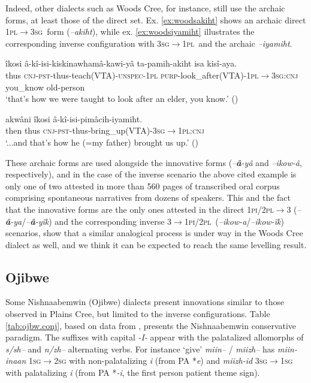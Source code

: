 \documentclass[twoside,a4paper,11pt]{article}
\newcommand{\ipa}[1]{{\phon\textit{#1}}}
\newcommand{\sg}{\textsc{sg}}
\newcommand{\pl}{\textsc{pl}}
\newcommand{\cnj}{\textsc{cnj}}
\newcommand{\pli}{\textsc{pi}}
\newcommand{\pst}{\textsc{pst}}
\newcommand{\purp}{\textsc{purp}}
\newcommand{\unspec}{\textsc{unspec}}
\begin{document}
Indeed, other dialects such as Woods Cree, for instance, still use the archaic forms, at least those of the direct set. Ex. \ref{ex:woodsakiht} shows an archaic direct 1\pl$\rightarrow$3\sg\ form (\ipa{--akiht}), while ex. \ref{ex:woodsiyamiht} illustrates the corresponding inverse configuration with 3\sg$\rightarrow$1\pl\ and the archaic \ipa{--iyamiht}.

\begin{exe}
\ex \label{ex:woodsakiht}
 \gll îkosi â-kî-isi-kiskinawhamâ-kawi-yâ ta-pamih-akiht isa kisî-aya.\\
thus {\cnj-\pst-thus-teach(VTA)-\unspec-1\pl} {\purp-look\_after(VTA)-1\pl$\rightarrow$3\sg:\cnj} {you\_know} {old-person}\\
\glt `that's how we were taught to look after an elder, you know.' (\citealp[p. 275]{castel})
\end{exe}

\begin{exe}
\ex \label{ex:woodsiyamiht}
 \gll akwâni îkosi â-kî-isi-pimâcih-iyamiht.\\
then thus \cnj-\pst-thus-bring\_up(VTA)-3\sg$\rightarrow$1\pl:\cnj\\
\glt `...and that's how he (=my father)  brought us up.' (\citealp[p. 182]{castel})
\end{exe}

These archaic forms are used alongside the innovative forms (\ipa{--\textbf{â}-yâ} and \ipa{--ikow-â}, respectively), and in the case of the inverse scenario the above cited example is only one of two attested in more than 560 pages of transcribed oral corpus comprising spontaneous narratives from dozens of speakers. This and the fact that the innovative forms are the only ones attested in the direct 1\pli/2\pl$\rightarrow$3 (\ipa{--\textbf{â}-ya}/\ipa{--\textbf{â}-yîk}) and the corresponding inverse 3$\rightarrow$1\pli/2\pl\ (\ipa{--ikow-a}/\ipa{--ikow-îk}) scenarios, show that a similar analogical process is under way in the Woods Cree dialect as well, and we think it can be expected to reach the same levelling result.


\subsection{Ojibwe} \label{subsec:ojibwe}
Some Nishnaabemwin (Ojibwe) dialects  present innovations similar to those observed in Plains Cree, but limited to the inverse configurations. Table \ref{tab:ojbw.conj}, based on data from \citet[295]{valentine01grammar}, presents the Nishnaabemwin conservative paradigm. The suffixes with capital \ipa{-I-} appear with the palatalized allomorphs of \ipa{s/sh--} and \ipa{n/zh--} alternating verbs. For instance `give' \ipa{miin--} / \ipa{miizh--} has \ipa{miin-inaan} 1\sg{}$\rightarrow$2\sg{} with non-palatalizing \ipa{i} (from PA *\ipa{e}) and \ipa{miizh-id} 3\sg{}$\rightarrow$1\sg{} with palatalizing \ipa{i} (from PA *\ipa{-i}, the first person patient theme sign).
\end{document}
